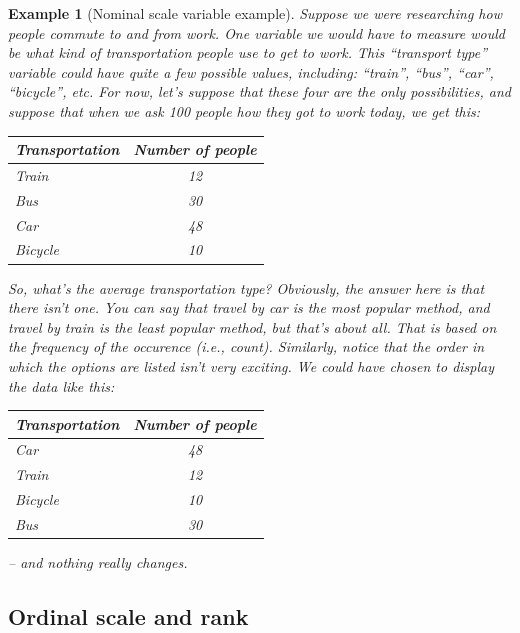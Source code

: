 \documentclass[
  11pt,
]{book}
\theoremstyle{indenteddefinition}
\theoremstyle{indenteddefinition}
\newtheorem{example}{Example}[chapter]
\theoremstyle{definition}
\theoremstyle{definition}
\theoremstyle{remark}
\begin{document}
\begin{example}[Nominal scale variable example]
\protect\hypertarget{exm:exnominal}{}\label{exm:exnominal}Suppose we were researching how people commute to and from work. One variable we would have to measure would be what kind of transportation people use to get to work. This ``transport type'' variable could have quite a few possible values, including: ``train'', ``bus'', ``car'', ``bicycle'', etc. For now, let's suppose that these four are the only possibilities, and suppose that when we ask 100 people how they got to work today, we get this:

\begin{table}[H]
\centering
\begin{tabular}{lc}
\toprule
Transportation & Number of people\\
\midrule
Train & 12\\
Bus & 30\\
Car & 48\\
Bicycle & 10\\
\bottomrule
\end{tabular}
\end{table}

So, what's the \emph{average transportation type}? Obviously, the answer here is that there isn't one. You can say that travel by car is the \emph{most popular method}, and travel by train is the \emph{least popular method}, but that's about all. That is based on the \emph{frequency} of the occurence (i.e., count). Similarly, notice that the order in which the options are listed isn't very exciting. We could have chosen to display the data like this:

\begin{table}[H]
\centering
\begin{tabular}{lc}
\toprule
Transportation & Number of people\\
\midrule
Car & 48\\
Train & 12\\
Bicycle & 10\\
Bus & 30\\
\bottomrule
\end{tabular}
\end{table}

-- and nothing really changes.
\end{example}

\hypertarget{ordinalscale}{%
\subsection{Ordinal scale and rank}\label{ordinalscale}}
\end{document}
